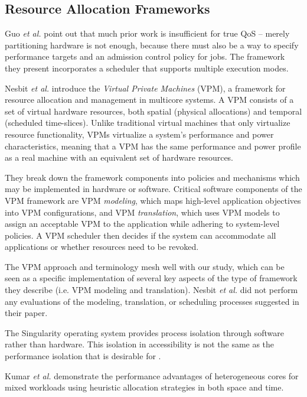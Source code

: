 \subsection*{Resource Allocation Frameworks}

Guo \emph{et al.}\cite{1331730} point out that much prior work is insufficient for true QoS -- merely partitioning hardware is not enough, because there must also be a way to specify performance targets and an admission control policy for jobs.
The framework they present incorporates a scheduler that supports multiple execution modes.

Nesbit \emph{et al.}\cite{1436097} introduce the \emph{Virtual Private Machines} (VPM), a framework for resource allocation and management in multicore systems. A VPM consists of a set of virtual hardware resources, both spatial (physical allocations) and temporal (scheduled time-slices).  Unlike traditional virtual machines that only virtualize resource functionality, VPMs virtualize a system's performance and power characteristics, meaning that a VPM has the same performance and power profile as a real machine with an equivalent set of hardware resources.

They break down the framework components into policies and mechanisms which may be implemented in hardware or software. Critical software components of the VPM framework are VPM {\em modeling}, which maps high-level application objectives into VPM configurations, and VPM {\em translation}, which uses VPM models to assign an acceptable VPM to the application while adhering to system-level policies. A VPM scheduler then decides if the system can accommodate all applications or whether resources need to be revoked.

The VPM approach and terminology mesh well with our study, which can be seen as a specific implementation of several key aspects of the type of framework they describe (i.e. VPM modeling and translation). Nesbit \emph{et al.} did not perform any evaluations of the modeling, translation, or scheduling processes suggested in their paper.

The Singularity operating system\cite{aiken-mspc06} provides process isolation through software rather than hardware.  This isolation in accessibility is not the same as the performance isolation that is desirable for \pacora.

Kumar \emph{et al.}\cite{1006707} demonstrate the performance advantages of heterogeneous cores for mixed workloads using heuristic allocation strategies in both space and time.


